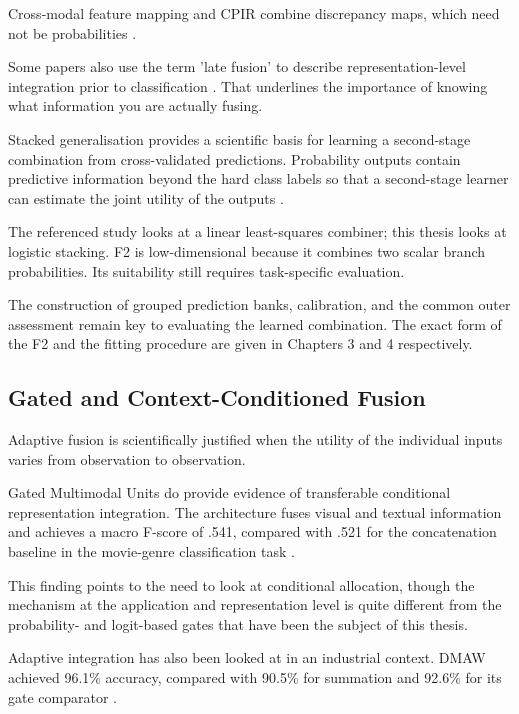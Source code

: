 Cross-modal feature mapping and CPIR combine discrepancy maps, which need not be probabilities
\parencite{Costanzino2024Multimodal,Shangguan2025CPIR}.

Some papers also use the term 'late fusion' to describe representation-level integration prior to
classification \parencite{Wang2020What}. That underlines the importance of knowing
what information you are actually fusing.

Stacked generalisation provides a scientific basis for learning a second-stage combination from
cross-validated predictions. Probability outputs contain predictive information beyond the hard
class labels so that a second-stage learner can estimate the joint utility of the outputs
\parencite[Sections~2--3]{Ting1999Issues}.

The referenced study looks at a linear least-squares combiner; this thesis looks at logistic
stacking. F2 is low-dimensional because it combines two scalar branch probabilities. Its suitability
still requires task-specific evaluation.

The construction of grouped prediction banks, calibration, and the common outer assessment remain
key to evaluating the learned combination. The exact form of the F2 and the fitting procedure are
given in Chapters 3 and 4 respectively.

\subsection{Gated and Context-Conditioned Fusion}

Adaptive fusion is scientifically justified when the utility of the individual inputs varies from
observation to observation.

Gated Multimodal Units do provide evidence of transferable conditional representation integration.
The architecture fuses visual and textual information and achieves a macro F-score of .541, compared
with .521 for the concatenation baseline in the movie-genre classification task \parencite[Section~3.1, Table~2]{P006}.

This finding points to the need to look at conditional allocation, though the mechanism at the
application and representation level is quite different from the probability- and logit-based gates
that have been the subject of this thesis.

Adaptive integration has also been looked at in an industrial context. DMAW achieved 96.1\%
accuracy, compared with 90.5\% for summation and 92.6\% for its gate comparator \parencite[PDF p.~9,
Table~V]{P003}.

